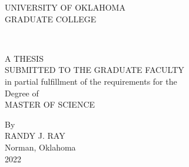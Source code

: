 \thispagestyle{empty}

\begin{center}
UNIVERSITY OF OKLAHOMA \\
\bigskip
GRADUATE COLLEGE \\

\vspace{1.5in}

\MakeUppercase{\mytitle{}} \\

\vspace{1.5in}

A THESIS \\
\bigskip
SUBMITTED TO THE GRADUATE FACULTY \\
\bigskip
in partial fulfillment of the requirements for the \\
\bigskip
Degree of \\
\bigskip
MASTER OF SCIENCE \\


\vfill

By \\
\bigskip
RANDY J. RAY \\
Norman, Oklahoma \\
2022 \\
\end{center}
\pagebreak
